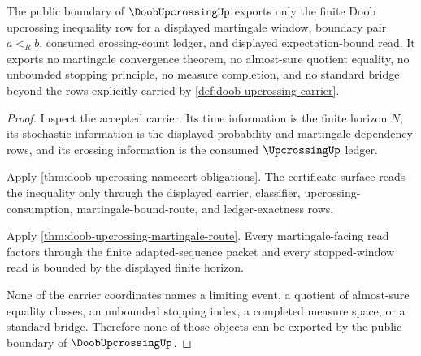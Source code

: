 \begin{theorem}
\label{thm:doob-upcrossing-noescape}
The public boundary of $\DoobUpcrossingUp$ exports only the finite Doob upcrossing inequality row for a displayed martingale window, boundary pair $a<_R b$, consumed crossing-count ledger, and displayed expectation-bound read. It exports no martingale convergence theorem, no almost-sure quotient equality, no unbounded stopping principle, no measure completion, and no standard bridge beyond the rows explicitly carried by \autoref{def:doob-upcrossing-carrier}.
\end{theorem}
\begin{proof}
Inspect the accepted carrier. Its time information is the finite horizon $N$, its stochastic information is the displayed probability and martingale dependency rows, and its crossing information is the consumed $\UpcrossingUp$ ledger.

Apply \autoref{thm:doob-upcrossing-namecert-obligations}. The certificate surface reads the inequality only through the displayed carrier, classifier, upcrossing-consumption, martingale-bound-route, and ledger-exactness rows.

Apply \autoref{thm:doob-upcrossing-martingale-route}. Every martingale-facing read factors through the finite adapted-sequence packet and every stopped-window read is bounded by the displayed finite horizon.

None of the carrier coordinates names a limiting event, a quotient of almost-sure equality classes, an unbounded stopping index, a completed measure space, or a standard bridge. Therefore none of those objects can be exported by the public boundary of $\DoobUpcrossingUp$.
\end{proof}


\begin{closurestatus}{\DoobUpcrossingUp}
  \theoryclosure{\seedClosure}
  \formalstatus{\unformalizedV}
\end{closurestatus}

